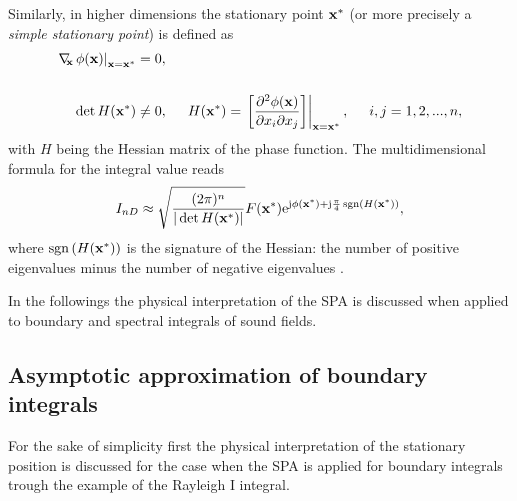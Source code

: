 \vspace{3mm}
Similarly, in higher dimensions the stationary point $\mathbf{x}^*$ (or more precisely a \emph{simple stationary point}) is defined as
\begin{align}
\label{Eq:ndim_stat_point}
\begin{split}
\left.
\Dx \phi(\vx)\right|_{\vx = \vx^*} &= 0,
\\ \vspace{3mm} \\
\det H(\vx^*) &\neq 0,
\hspace{5mm} 
H(\vx^*) = \left. \left[
\frac{\partial^2 \phi(\vx)}{\partial x_i \partial x_j} 
\right] \right|_{\vx = \vx^*},
\hspace{5mm}
i,j = 1,2,...,n,
\end{split}
\end{align}
with $H$ being the Hessian matrix of the phase function.
The multidimensional formula for the integral value reads
\begin{equation}
\label{Eq:SPAResult_nd}
I_{nD} \approx \sqrt{\frac{(2\pi)^n}{|\det H(\mathbf{x}^*)|}} F(\mathbf{x}^*) \mathrm{e}^{\mathrm{j} \phi(\mathbf{x}^*) + \mathrm{j} \frac{\pi}{4}\,\mathrm{sgn}\left( H(\mathbf{x}^*) \right)},
\end{equation}
where $\mathrm{sgn}\left( H(\mathbf{x}^*) \right)$ is the signature of the Hessian: the number of positive eigenvalues minus the number of negative eigenvalues \cite{Bleistein2000}.

In the followings the physical interpretation of the SPA is discussed when applied to boundary and spectral integrals of sound fields.

\subsection{Asymptotic approximation of boundary integrals}
\label{Sec:HS_approx:SPA_for_Rayleigh}
For the sake of simplicity first the physical interpretation of the stationary position is discussed for the case when the SPA is applied for boundary integrals trough the example of the Rayleigh I integral.
%

